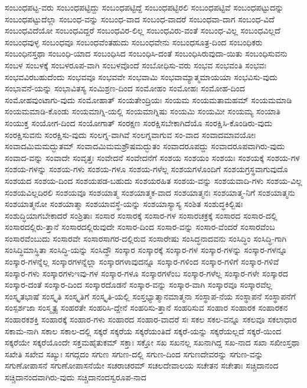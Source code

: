 {ಸಂಬಂಧಪಟ್ಟ-ವರು
ಸಂಬಂಧಪಟ್ಟಿದ್ದು
ಸಂಬಂಧಪಟ್ಟಿದ್ದೆ
ಸಂಬಂಧಪಟ್ಟಿರಲಿ
ಸಂಬಂಧಪಟ್ಟಿವೆ
ಸಂಬಂಧಪಟ್ಟುದನ್ನು
ಸಂಬಂಧಪಟ್ಟುದೆಲ್ಲಾ
ಸಂಬಂಧ-ವನ್ನು
ಸಂಬಂಧ-ವಾದ
ಸಂಬಂಧ-ವಾದರೆ
ಸಂಬಂಧವಾ-ದಾಗ
ಸಂಬಂಧ-ವಿದೆ
ಸಂಬಂಧವಿದೆಯೋ
ಸಂಬಂಧವಿದ್ದರೆ
ಸಂಬಂಧವಿರ-ಲಿಲ್ಲ
ಸಂಬಂಧವಿರು-ವಂತೆ
ಸಂಬಂಧ-ವಿಲ್ಲ
ಸಂಬಂಧವಿಲ್ಲದೆ
ಸಂಬಂಧವುಳ್ಳ
ಸಂಬಂಧವೂ
ಸಂಬಂಧವೆಂತಹುದು
ಸಂಬಂಧವೇನು
ಸಂಬಂಧಸೂತ್ರ-ದಿಂದ
ಸಂಬಂಧಿಕರು
ಸಂಬಂಧಿನಸ್ತಥಾ
ಸಂಬಂಧಿ-ಯಾದ
ಸಂಬಂಧಿಸಿದ
ಸಂಬಂಧಿಸಿ-ದಂತೆ
ಸಂಬಂಧಿಸಿರುವುದಾ-ಯಿತು
ಸಂಬಂಧಿಸುವನು
ಸಂಬಳ
ಸಂಬಳಕ್ಕೆ
ಸಂಬಳರೂಪ-ವಾಗಿ
ಸಂಬಳವೊಂದೆ
ಸಂಬೋಧಿಸು-ವರು
ಸಂಭವ
ಸಂಭವಂತಿ
ಸಂಭವಃ
ಸಂಭವವಿರಬಹುದೆಂದು
ಸಂಭವವೂ
ಸಂಭವವೇ
ಸಂಭವಾಮಿ
ಸಂಭವಾಮ್ಯಾತ್ಮಮಾಯಯಾ
ಸಂಭವಿಸು-ವುದು
ಸಂಭಾವನೆ-ಯನ್ನು
ಸಂಭಾವಿತಸ್ಯ
ಸಂಮಿಶ್ರಣ-ದಿಂದ
ಸಂಮೋಹಂ
ಸಂಮೋಹಃ
ಸಂಮೋಹ-ದಿಂದ
ಸಂಮೋಹವುಂಟಾಗು-ವುದು
ಸಂಮೋಹಾತ್
ಸಂಯತೇಂದ್ರಿಯಃ
ಸಂಯಮ
ಸಂಯಮತಾಮಹಮ್
ಸಂಯಮಮಾಡಿ
ಸಂಯಮಮಾಡಿ-ಕೊಂಡು
ಸಂಯಮಾಗ್ನಿ-ಯಲ್ಲಿ
ಸಂಯಮಾಗ್ನಿಷು
ಸಂಯಮಿ
ಸಂಯಮೀ
ಸಂಯಮ್ಯ
ಸಂಯಾತಿ
ಸಂಯುಕ್ತ
ಸಂಯೋಗ-ದಿಂದ
ಸಂಯೋಗಾತ್
ಸಂರಕ್ಷಣ
ಸಂರಕ್ಷಿಸಬೇಕಾಗಿದೆಯೊ
ಸಂರಕ್ಷಿಸಿ-ಕೊಂಡಿರು-ವುದು
ಸಂರಕ್ಷಿಸುವನು
ಸಂರಕ್ಷಿಸು-ವುದು
ಸಂಲಗ್ನ-ವಾಗಿವೆ
ಸಂಲಗ್ನವಾಗುವ
ಸಂ-ವಾದ
ಸಂವಾದಮಾವಯೋಃ
ಸಂವಾದಮಿಮಮದ್ಭುತಮ್
ಸಂವಾದಮಿಮಮಶ್ರೌಷಮದ್ಭುತಂ
ಸಂವಾದರೂಪದ್ದು
ಸಂವಾದರೂಪವಾಗಿರು-ವುದು
ಸಂವಾದ-ವನ್ನು
ಸಂವಾದೇ
ಸಂವೃತ್ತಃ
ಸಂವೇದನೆ
ಸಂವೇದನೆಗೆ
ಸಂಶಯ
ಸಂಶಯಂ
ಸಂಶಯಃ
ಸಂಶಯಕ್ಕೆ
ಸಂಶಯ-ಗಳ
ಸಂಶಯ-ಗಳನ್ನು
ಸಂಶಯ-ಗಳು
ಸಂಶಯ-ಗಳೂ
ಸಂಶಯ-ಗಳೆಲ್ಲ
ಸಂಶಯಗಳೊಂದಿಗೆ
ಸಂಶಯಗ್ರಸ್ಥವಾಗುವುದೊ
ಸಂಶಯದ
ಸಂಶಯ-ದಿಂದ
ಸಂಶಯಪಡ-ಬಹುದು
ಸಂಶಯರಹಿತ
ಸಂಶಯ-ವನ್ನು
ಸಂಶಯವಾದಿ-ಗಳು
ಸಂಶಯ-ವಿಲ್ಲ
ಸಂಶಯವಿಲ್ಲದಿರಲಿ
ಸಂಶಯವೂ
ಸಂಶಯಾತ್ಮ
ಸಂಶಯಾತ್ಮಕ-ವಾದ
ಸಂಶಯಾತ್ಮನಃ
ಸಂಶಯಾತ್ಮ-ನಿಗೆ
ಸಂಶಯಾತ್ಮನು
ಸಂಶಯಾತ್ಮನೋ
ಸಂಶಯಾತ್ಮಾ
ಸಂಶಯಾವಸ್ಥೆ-ಯನ್ನು
ಸಂಶಯಾಸ್ಯಾಸ್ಯ
ಸಂಶಿತ
ಸಂಶುದ್ಧಕಿಲ್ಬಿಷಃ
ಸಂಶುದ್ಧಿಯಾಗಬೇಕಾದರೆ
ಸಂಶ್ರಿತಾಃ
ಸಂಸಾರ
ಸಂಸಾರಕ್ಕೆ
ಸಂಸಾರ-ಗಳ
ಸಂಸಾರಚಕ್ರಕ್ಕೆ
ಸಂಸಾರದ
ಸಂಸಾರ-ದಲ್ಲಿ
ಸಂಸಾರದಲ್ಲಿರು-ತ್ತಾನೆ
ಸಂಸಾರದಲ್ಲಿರುವುದೇ
ಸಂಸಾರ-ದಿಂದ
ಸಂಸಾರ-ವನ್ನು
ಸಂಸಾರ-ವೆಂದರೆ
ಸಂಸಾರವೆಂಬ
ಸಂಸಾರವೆಂಬುದು
ಸಂಸಾರವೇ
ಸಂಸಾರಸಾಗರ-ದಲ್ಲಿರುವ
ಸಂಸಾರೇಷು
ಸಂಸಿದ್ಧನಾದವನು
ಸಂಸಿದ್ಧಿಂ
ಸಂಸಿದ್ಧಿ-ಗಾಗಿ
ಸಂಸಿದ್ಧಿಮಾಸ್ಥಿತಾ
ಸಂಸಿದ್ಧಿ-ಯನ್ನು
ಸಂಸಿದ್ಧೌ
ಸಂಸ್ಕಾರ
ಸಂಸ್ಕಾರಕ್ಕೆ
ಸಂಸ್ಕಾರ-ಗಳ
ಸಂಸ್ಕಾರ-ಗಳನ್ನು
ಸಂಸ್ಕಾರ-ಗಳನ್ನೂ
ಸಂಸ್ಕಾರ-ಗಳನ್ನೆಲ್ಲ
ಸಂಸ್ಕಾರಗಳನ್ನೆಲ್ಲಾ
ಸಂಸ್ಕಾರಗಳಾವುದನ್ನೂ
ಸಂಸ್ಕಾರ-ಗಳಿಂದ
ಸಂಸ್ಕಾರ-ಗಳಿಗೆ
ಸಂಸ್ಕಾರ-ಗಳಿವೆ
ಸಂಸ್ಕಾರ-ಗಳು
ಸಂಸ್ಕಾರಗಳುಇವು-ಗಳ
ಸಂಸ್ಕಾರ-ಗಳೂ
ಸಂಸ್ಕಾರಗಳೆಂಬ
ಸಂಸ್ಕಾರ-ಗಳೆಲ್ಲ
ಸಂಸ್ಕಾರ-ಗಳೇ
ಸಂಸ್ಕಾರದ
ಸಂಸ್ಕಾರ-ದಂತೆ
ಸಂಸ್ಕಾರ-ದಿಂದ
ಸಂಸ್ಕಾರದೊಡನೆ
ಸಂಸ್ಕಾರ-ವನ್ನು
ಸಂಸ್ಕಾರ-ವಾಗಿ
ಸಂಸ್ಕಾರವೂ
ಸಂಸ್ಕಾರವೆಲ್ಲ
ಸಂಸ್ಕೃತಭಾಷೆ
ಸಂಸ್ಕೃತಿ
ಸಂಸ್ಕೃತಿಗೆ
ಸಂಸ್ಕೃತಿ-ಯಲ್ಲಿ
ಸಂಸ್ತಭ್ಯಾತ್ಮಾನಮಾತ್ಮನಾ
ಸಂಸ್ಥಾಪ-ನೆಯ
ಸಂಸ್ಥಾಪನೆ
ಸಂಸ್ಥಾಪನೆಗೆ
ಸಂಸ್ಪರ್ಶಜಾ
ಸಂಸ್ಮೃತ್ಯ
ಸಂಹರತೇ
ಸಂಹರಿಸಿ-ದ್ದೇನೆ
ಸಂಹರಿಸು-ತ್ತಾನೆ
ಸಂಹರಿಸುವ
ಸಂಹಾರ
ಸಂಹಾರಕ
ಸಂಹಾರಕನ
ಸಂಹಾರಕಶಕ್ತಿ
ಸಂಹಾರಕ್ಕೆ
ಸಂಹಾರ-ಗಳು
ಸಂಹಾರದ
ಸಂಹಾರ-ವಾದರೆ
ಸಃ
ಸಕಲ
ಸಕಲ-ವನ್ನೂ
ಸಕಲವೂ
ಸಕಲಾಧಾರ
ಸಕಾಮ-ನಾಗಿ
ಸಕಾಲ
ಸಕಾಲ-ದಲ್ಲಿ
ಸಕ್ಕರೆ
ಸಕ್ಕರೆಯ
ಸಕ್ಕರೆಯಂತಿದೆ
ಸಕ್ಕರೆ-ಯನ್ನು
ಸಕ್ಕರೆಯಲ್ಲದೆ
ಸಕ್ಕರೆ-ಯಿಂದ
ಸಕ್ಕರೆಯೇ
ಸಕ್ಕರೆಯೊಂದೇ
ಸಕ್ತಮಹೈತುಕಮ್
ಸಕ್ತಾಃ
ಸಕ್ತೋ
ಸಖ
ಸಖನಲ್ಲ
ಸಖನಾಗಿದ್ದ
ಸಖ-ನಾದ
ಸಖಾ
ಸಖೀಂಸ್ತಥಾ
ಸಖೇತಿ
ಸಖೇವ
ಸಖ್ಯುಃ
ಸಗದ್ಗದಂ
ಸಗುಣ
ಸಗುಣ-ದಲ್ಲಿ
ಸಗುಣ-ದಿಂದ
ಸಗುಣದೇವರನ್ನು
ಸಗುಣ-ವನ್ನು
ಸಗುಣೋಪಾಸನೆ
ಸಗುಣೋಪಾಸನೆಯೇ
ಸಚರಾಚರಮ್
ಸಚಲದೇವಾಲಯ
ಸಚೇತನ
ಸಚೇತಾಃ
ಸಚ್ಚಿದಾನಂದ
ಸಚ್ಚಿದಾನಂದವಾಗಿರು-ವುದು
ಸಚ್ಚಿದಾನಂದಸ್ವರೂಪ-ನಾದ
}
